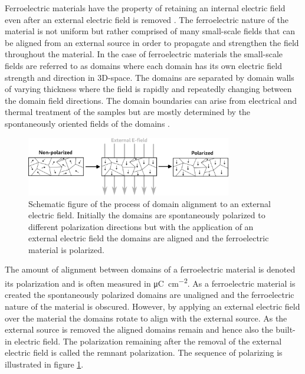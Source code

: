 \documentclass[11pt,twoside,final]{eitExjobb}  %
\begin{document}
Ferroelectric materials have the property of retaining an internal electric
field even after an external electric field is removed
\cite{dawber2005physics}. The ferroelectric nature of the material is not
uniform but rather comprised of many small-scale fields that can be aligned
from an external source in order to propagate and strengthen the field
throughout the material. In the case of ferroelectric materials the small-scale
fields are referred to as domains where each domain has its own electric field
strength and direction in 3D-space. The domains are separated by domain walls
of varying thickness where the field is rapidly and repeatedly changing between
the domain field directions. The domain boundaries can arise from electrical
and thermal treatment of the samples but are mostly determined by the
spontaneously oriented fields of the domains \cite{damjanovic2006hysteresis}.

\begin{figure}[htbp]
    \centering
    \includegraphics[width=0.80\textwidth]{fig/img/polarized.png}
    \caption{Schematic figure of the process of domain alignment to an external
    electric field. Initially the domains are spontaneously polarized to
    different polarization directions but with the application of an external
    electric field the domains are aligned and the ferroelectric material is
    polarized.}
    \label{fig:theo_domain}
\end{figure}

The amount of alignment between domains of a ferroelectric material is denoted
its polarization and is often measured in
\si{\micro\coulomb\per\centi\meter\squared}. As a ferroelectric material is
created the spontaneously polarized domains are unaligned and the ferroelectric
nature of the material is obscured. However, by applying an external electric
field over the material the domains rotate to align with the external source.
As the external source is removed the aligned domains remain and hence also the
built-in electric field. The polarization remaining after the removal of the
external electric field is called the remnant polarization. The sequence of
polarizing is illustrated in figure \ref{fig:theo_domain}.
\end{document}
